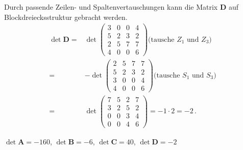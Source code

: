 {Durch passende Zeilen- und Spaltenvertauschungen kann die Matrix $\boldsymbol D$
auf Blockdreiecksstruktur gebracht werden.
\begin{align*}
\det \boldsymbol D =&\det\begin{pmatrix}
   3 &   0 &   0 &   4 \\
   5 &   2 &   3 &   2 \\
   2 &   5 &   7 &   7 \\
   4 &   0 &   0 &   6 
\end{pmatrix} \text{(tausche $Z_1$ und $Z_3$)}\\
=& - \det\begin{pmatrix}
   2 &   5 &   7 &   7 \\
   5 &   2 &   3 &   2 \\
   3 &   0 &   0 &   4 \\
   4 &   0 &   0 &   6 
\end{pmatrix} \text{(tausche $S_1$ und $S_3$)}\\
=&   \det\begin{pmatrix}
   7 &   5 &   2 &   7 \\
   3 &   2 &   5 &   2 \\
   0 &   0 &   3 &   4 \\
   0 &   0 &   4 &   6 
\end{pmatrix} = -1 \cdot 2 = -2 \,.
\end{align*}

}

{
$\det \boldsymbol A = -160$, $\det \boldsymbol B = -6$, $\det \boldsymbol C = 40$, $\det \boldsymbol D = -2$
}
